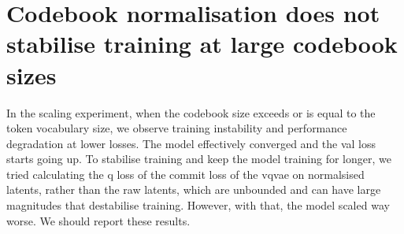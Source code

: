 \clearpage
\appendix


\section{Codebook normalisation does not stabilise training at large codebook sizes}
In the scaling experiment, when the codebook size exceeds or is equal to the token vocabulary size, we observe training instability and performance degradation at lower losses.
The model effectively converged and the val loss starts going up.
To stabilise training and keep the model training for longer, we tried calculating the q loss of the commit loss of the vqvae on normalsised latents, rather than the raw latents, which are unbounded and can have large magnitudes that destabilise training.
However, with that, the model scaled way worse. We should report these results.